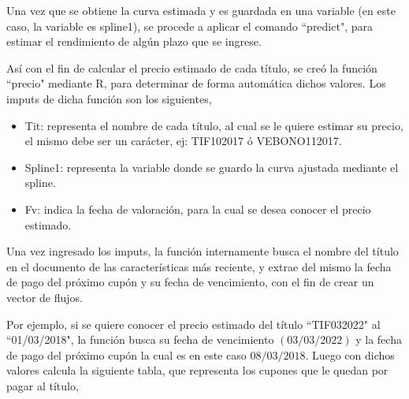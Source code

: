 \hspace{0.4cm} Una vez que se obtiene la curva estimada y es guardada en una variable (en este caso, la variable es spline1), se procede a aplicar el comando ``predict", para estimar el rendimiento de alg\'un plazo que se ingrese.

\hspace{0.4cm} As\'i con el fin de calcular el precio estimado de cada t\'itulo, se cre\'o la funci\'on ``precio" mediante R, para determinar de forma autom\'atica dichos valores. Los imputs de dicha funci\'on son los siguientes,


\begin{itemize}
  \item Tit: representa el nombre de cada t\'itulo, al cual se le quiere estimar su precio, el mismo debe ser un car\'acter, ej: TIF102017 \'o VEBONO112017.
  \item Spline1: representa la variable donde se guardo la curva ajustada mediante el spline.
  \item Fv: indica la fecha de valoraci\'on, para la cual se desea conocer el precio estimado.
\end{itemize}


\hspace{0.4cm} Una vez ingresado los imputs, la funci\'on internamente busca el nombre del t\'itulo en el documento de las caracter\'isticas m\'as reciente, y extrae del mismo la fecha de pago del pr\'oximo cup\'on y su fecha de vencimiento, con el fin de crear un vector de flujos.


\hspace{0.4cm} Por ejemplo, si se quiere conocer el precio estimado del t\'itulo ``TIF032022" \hspace{0.2cm} al ``01/03/2018", la funci\'on busca su fecha de vencimiento $(03/03/2022)$ y la fecha de pago del pr\'oximo cup\'on la cual es en este caso $08/03/2018$. Luego con dichos valores calcula la siguiente tabla, que representa los cupones que le quedan por pagar al t\'itulo,

